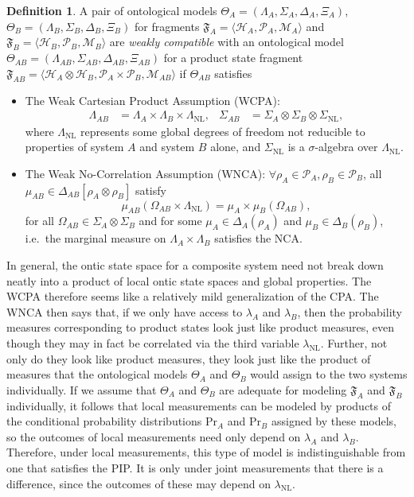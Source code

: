 \documentclass[DIV=calc,fontsize=12pt]{scrartcl} %
\theoremstyle{definition}
\newtheorem{definition}{Definition}[section]
\theoremstyle{plain}
\newcommand{\Hilb}[1][]{\ensuremath{\mathcal{H}_{#1}}}
\begin{document}
\begin{definition}
A pair of ontological models $\Theta_A = (\Lambda_A, \Sigma_A,
\Delta_A, \Xi_A)$, $\Theta_B = (\Lambda_B, \Sigma_B, \Delta_B, \Xi_B)$
for fragments $\mathfrak{F}_A = \langle \Hilb[A], \mathcal{P}_A,
\mathcal{M}_A \rangle$ and $\mathfrak{F}_B = \langle \Hilb[B],
\mathcal{P}_B, \mathcal{M}_B \rangle$ are \emph{weakly compatible}
with an ontological model $\Theta_{AB} = (\Lambda_{AB}, \Sigma_{AB},
\Delta_{AB}, \Xi_{AB})$ for a product state fragment
$\mathfrak{F}_{AB} = \langle \Hilb[A] \otimes \Hilb[B],
\mathcal{P}_A \times \mathcal{P}_B, \mathcal{M}_{AB} \rangle$ if
$\Theta_{AB}$ satisfies
\begin{itemize}
\item The Weak Cartesian Product Assumption (WCPA):
\begin{align}
\Lambda_{AB} & = \Lambda_A \times \Lambda_B \times
\Lambda_{\text{NL}}, & \Sigma_{AB} & = \Sigma_A \otimes \Sigma_B \otimes
\Sigma_{\text{NL}},
\end{align}
where $\Lambda_{\text{NL}}$ represents some global degrees of
freedom not reducible to properties of system $A$ and system $B$
alone, and $\Sigma_{\text{NL}}$ is a $\sigma$-algebra over
$\Lambda_{\text{NL}}$.
\item The Weak No-Correlation Assumption (WNCA): $\forall \rho_A \in
\mathcal{P}_A, \rho_B \in \mathcal{P}_B$, all $\mu_{AB} \in
\Delta_{AB}[\rho_A \otimes \rho_B]$ satisfy
\begin{equation}
\mu_{AB}(\Omega_{AB} \times \Lambda_{\text{NL}}) = \mu_A
\times \mu_B(\Omega_{AB}),
\end{equation}
for all $\Omega_{AB} \in \Sigma_A \otimes \Sigma_B$ and for some
$\mu_A \in \Delta_A(\rho_A)$ and $\mu_B \in \Delta_B(\rho_B)$,
i.e.\ the marginal measure on $\Lambda_A \times \Lambda_B$
satisfies the NCA.
\end{itemize}
\end{definition}

In general, the ontic state space for a composite system need not
break down neatly into a product of local ontic state spaces and
global properties.  The WCPA therefore seems like a relatively mild
generalization of the CPA\@.  The WNCA then says that, if we only have
access to $\lambda_A$ and $\lambda_B$, then the probability measures
corresponding to product states look just like product measures, even
though they may in fact be correlated via the third variable
$\lambda_{\text{NL}}$.  Further, not only do they look like product
measures, they look just like the product of measures that the
ontological models $\Theta_A$ and $\Theta_B$ would assign to the two
systems individually.  If we assume that $\Theta_A$ and $\Theta_B$ are
adequate for modeling $\mathfrak{F}_A$ and $\mathfrak{F}_B$
individually, it follows that local measurements can be modeled by
products of the conditional probability distributions $\text{Pr}_A$
and $\text{Pr}_B$ assigned by these models, so the outcomes of local
measurements need only depend on $\lambda_A$ and $\lambda_B$.
Therefore, under local measurements, this type of model is
indistinguishable from one that satisfies the PIP\@.  It is only under
joint measurements that there is a difference, since the outcomes of
these may depend on $\lambda_{\text{NL}}$.
\end{document}
